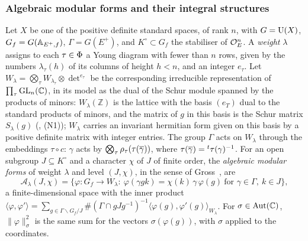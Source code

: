 \documentclass[10pt]{amsart}
\theoremstyle{definition}
\theoremstyle{remark}
\newcommand{\C}{\mathbb C}
\newcommand{\Z}{\mathbb Z}
\begin{document}
\subsubsection*{Algebraic modular forms and their integral structures}
Let $X$ be one of the positive definite standard spaces, of rank $n$, with $G=\mathrm U(X)$,
$G_f=G(\mathbb A_{E^+,f})$, $\Gamma=G(E^+)$, and $K^\circ\subset G_f$ the stabiliser of $\mathcal O_E^n$. A
\emph{weight} $\lambda$ assigns to each $\tau\in\Phi$ a Young diagram with fewer than $n$ rows,
given by the numbers $\lambda_\tau(h)$ of its columns of height $h<n$, and an integer $e_\tau$.
Let $W_\lambda=\bigotimes_\tau W_{\lambda_\tau}\otimes\det^{e_\tau}$ be the corresponding
irreducible representation of $\prod_\tau\auGL_n(\C)$, in its model as the dual of the Schur module
spanned by the products of minors: $W_\lambda(\Z)$ is the lattice with the basis $(e_T)$ dual to the
standard products of minors, and the matrix of $g$ in this basis is the Schur matrix $S_\lambda(g)$
({\cite[\S6.1]{P49}}, (N1)); $W_\lambda$ carries an invariant hermitian form given on this basis by a
positive definite matrix with integer entries. The group $\Gamma$ acts on $W_\lambda$ through the
embeddings $\tau\circ c$: $\gamma$ acts by $\bigotimes_\tau\rho_\tau(\tau(\overline{\gamma}))$, where
$\tau(\overline{\gamma})={}^t\tau(\gamma)^{-1}$. For an open
subgroup $J\subseteq K^\circ$ and a character $\chi$ of $J$ of finite order, the \emph{algebraic
modular forms} of weight $\lambda$ and level $(J,\chi)$, in the sense of Gross~\cite{GrossAMF},
are
\[
\mathcal A_\lambda(J,\chi)=\{\varphi\colon G_f\to W_\lambda:\ \varphi(\gamma gk)=\chi(k)\,\gamma\,
\varphi(g)\ \text{for }\gamma\in\Gamma,\ k\in J\},
\]
a finite-dimensional space with the inner product
$\langle\varphi,\varphi'\rangle=\sum_{g\in\Gamma\backslash G_f/J}\#(\Gamma\cap gJg^{-1})^{-1}
\langle\varphi(g),\varphi'(g)\rangle_{W_\lambda}$. For $\sigma\in\auAut(\C)$,
$\|\varphi\|_\sigma^2$ is the same sum for the vectors $\sigma(\varphi(g))$, with $\sigma$ applied
to the coordinates.
\end{document}
